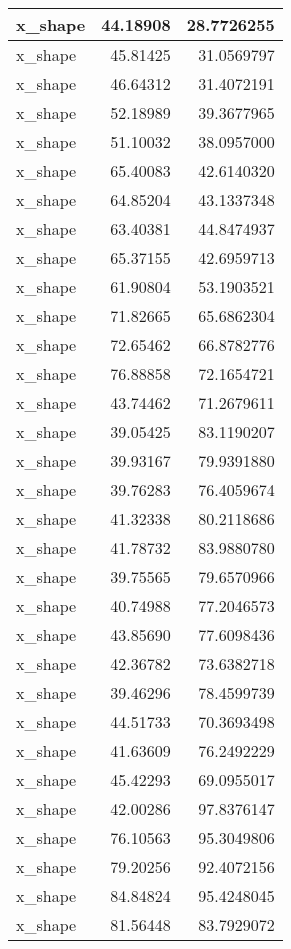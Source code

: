 \documentclass[
]{book}
\theoremstyle{definition}
\theoremstyle{definition}
\theoremstyle{definition}
\theoremstyle{definition}
\theoremstyle{remark}
\begin{document}
\begin{tabular}{l|r|r}
\hline
x\_shape & 44.18908 & 28.7726255\\
\hline
x\_shape & 45.81425 & 31.0569797\\
\hline
x\_shape & 46.64312 & 31.4072191\\
\hline
x\_shape & 52.18989 & 39.3677965\\
\hline
x\_shape & 51.10032 & 38.0957000\\
\hline
x\_shape & 65.40083 & 42.6140320\\
\hline
x\_shape & 64.85204 & 43.1337348\\
\hline
x\_shape & 63.40381 & 44.8474937\\
\hline
x\_shape & 65.37155 & 42.6959713\\
\hline
x\_shape & 61.90804 & 53.1903521\\
\hline
x\_shape & 71.82665 & 65.6862304\\
\hline
x\_shape & 72.65462 & 66.8782776\\
\hline
x\_shape & 76.88858 & 72.1654721\\
\hline
x\_shape & 43.74462 & 71.2679611\\
\hline
x\_shape & 39.05425 & 83.1190207\\
\hline
x\_shape & 39.93167 & 79.9391880\\
\hline
x\_shape & 39.76283 & 76.4059674\\
\hline
x\_shape & 41.32338 & 80.2118686\\
\hline
x\_shape & 41.78732 & 83.9880780\\
\hline
x\_shape & 39.75565 & 79.6570966\\
\hline
x\_shape & 40.74988 & 77.2046573\\
\hline
x\_shape & 43.85690 & 77.6098436\\
\hline
x\_shape & 42.36782 & 73.6382718\\
\hline
x\_shape & 39.46296 & 78.4599739\\
\hline
x\_shape & 44.51733 & 70.3693498\\
\hline
x\_shape & 41.63609 & 76.2492229\\
\hline
x\_shape & 45.42293 & 69.0955017\\
\hline
x\_shape & 42.00286 & 97.8376147\\
\hline
x\_shape & 76.10563 & 95.3049806\\
\hline
x\_shape & 79.20256 & 92.4072156\\
\hline
x\_shape & 84.84824 & 95.4248045\\
\hline
x\_shape & 81.56448 & 83.7929072\\

\end{tabular}
\end{document}
